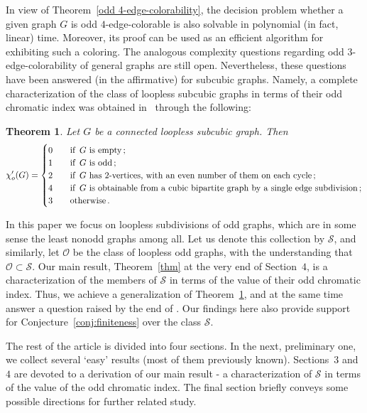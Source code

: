 \documentclass[a4paper,12pt]{article}
\newtheorem{theorem}{Theorem}[section]
\numberwithin{equation}{section}
\begin{document}
In view of Theorem~\ref{odd 4-edge-colorability}, the decision problem whether a given graph $G$ is odd $4$-edge-colorable is also solvable in polynomial (in fact, linear) time. Moreover, its proof can be used as an efficient algorithm for exhibiting such a coloring. The analogous complexity questions regarding odd $3$-edge-colorability of general graphs are still open. Nevertheless, these questions have been answered (in the affirmative) for subcubic graphs. Namely, a complete characterization of the class of loopless subcubic graphs in terms of their odd chromatic index was obtained in~\cite{AtaPetSkr16} through the following:

\begin{theorem}
    \label{thm:characterizationsubcubic}
Let $G$ be a connected loopless subcubic graph. Then
\begin{equation*}
\chi'_o(G)=
\begin{cases}
0 & \text{\quad if\, } G \text{ is empty}\,;\\
1 & \text{\quad if \,} G \text{ is odd} \,;\\
2 & \text{\quad if \,} G \text{ has 2-vertices, with an even number of them on each cycle}\,;\\
4 & \text{\quad if \,} G \text{ is obtainable from a cubic bipartite graph by a single edge subdivision}\,;\\
3 & \text{\quad otherwise}\,.
\end{cases}
\end{equation*}
\end{theorem}

In this paper we focus on loopless subdivisions of odd graphs, which are in some sense the least nonodd graphs among all. Let us denote this collection by $\mathcal{S}$, and similarly, let $\mathcal{O}$ be the class of loopless odd graphs, with the understanding that $\mathcal{O}\subset\mathcal{S}$. Our main result,  Theorem~\ref{thm} at the very end of Section~$4$, is a characterization of the members of $\mathcal{S}$ in terms of the value of their odd chromatic index. Thus, we achieve a generalization of Theorem~\ref{thm:characterizationsubcubic}, and at the same time answer a question raised by the end of \cite{Pet18}. Our findings here also provide support for  Conjecture~\ref{conj:finiteness} over the class $\mathcal{S}$.

\medskip

The rest of the article is divided into four sections. In the next, preliminary one, we collect several `easy' results (most of them previously known). Sections~$3$ and $4$ are devoted to a derivation of our main result - a characterization of $\mathcal{S}$ in terms of the value of the odd chromatic index. The final section briefly conveys some possible directions for further related study.
\end{document}
